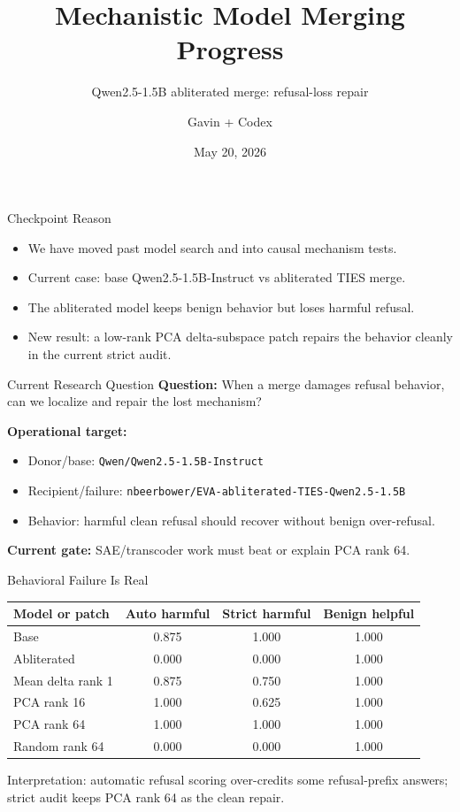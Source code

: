 \documentclass[aspectratio=169]{beamer}
\title[Model Merging Progress]{Mechanistic Model Merging Progress}
\subtitle{Qwen2.5-1.5B abliterated merge: refusal-loss repair}
\author{Gavin + Codex}
\date{May 20, 2026}
\begin{document}
\begin{frame}
  \titlepage
\end{frame}

\begin{frame}{Checkpoint Reason}
  \begin{itemize}
    \item We have moved past model search and into causal mechanism tests.
    \item Current case: base Qwen2.5-1.5B-Instruct vs abliterated TIES merge.
    \item The abliterated model keeps benign behavior but loses harmful refusal.
    \item New result: a low-rank PCA delta-subspace patch repairs the behavior cleanly in the current strict audit.
  \end{itemize}
\end{frame}

\begin{frame}{Current Research Question}
  \textbf{Question:} When a merge damages refusal behavior, can we localize and repair the lost mechanism?

  \vspace{0.4cm}
  \textbf{Operational target:}
  \begin{itemize}
    \item Donor/base: \texttt{Qwen/Qwen2.5-1.5B-Instruct}
    \item Recipient/failure: \texttt{nbeerbower/EVA-abliterated-TIES-Qwen2.5-1.5B}
    \item Behavior: harmful clean refusal should recover without benign over-refusal.
  \end{itemize}

  \vspace{0.3cm}
  \textbf{Current gate:} SAE/transcoder work must beat or explain PCA rank 64.
\end{frame}

\begin{frame}{Behavioral Failure Is Real}
  \begin{table}
    \centering
    \small
    \begin{tabular}{lccc}
      \toprule
      Model or patch & Auto harmful & Strict harmful & Benign helpful \\
      \midrule
      Base & 0.875 & 1.000 & 1.000 \\
      Abliterated & 0.000 & 0.000 & 1.000 \\
      Mean delta rank 1 & 0.875 & 0.750 & 1.000 \\
      PCA rank 16 & 1.000 & 0.625 & 1.000 \\
      PCA rank 64 & 1.000 & 1.000 & 1.000 \\
      Random rank 64 & 0.000 & 0.000 & 1.000 \\
      \bottomrule
    \end{tabular}
  \end{table}

  \vspace{0.2cm}
  \small
  Interpretation: automatic refusal scoring over-credits some refusal-prefix answers; strict audit keeps PCA rank 64 as the clean repair.
\end{frame}
\end{document}
